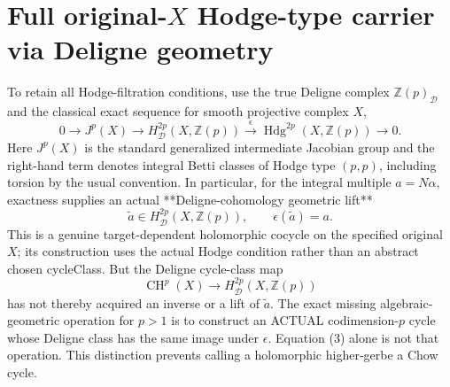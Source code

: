 \documentclass[11pt]{article}
\newcommand{\Z}{\mathbb Z}
\newcommand{\CH}{\operatorname{CH}}
\newcommand{\Hdg}{\operatorname{Hdg}}
\begin{document}
\section{Full original-\(X\) Hodge-type carrier via Deligne geometry}
To retain all Hodge-filtration conditions, use the
true Deligne complex \(\Z(p)_{\mathcal D}\) and the
classical exact sequence for smooth projective complex \(X\),
\[
 0\to J^p(X)
 \longrightarrow H^{2p}_{\mathcal D}(X,\Z(p))
 \xrightarrow{\epsilon}
 \Hdg^{2p}(X,\Z(p))
 \to0.                                              \tag{2}
\]
Here \(J^p(X)\) is the standard generalized intermediate
Jacobian group and the right-hand term denotes integral
Betti classes of Hodge type \((p,p)\), including torsion
by the usual convention. In particular, for the integral
multiple \(a=N\alpha\), exactness supplies an actual
**Deligne-cohomology geometric lift**
\[
 \boxed{\widetilde a\in
 H^{2p}_{\mathcal D}(X,\Z(p)),
 \qquad \epsilon(\widetilde a)=a.}                  \tag{3}
\]
This is a genuine target-dependent holomorphic cocycle on
the specified original \(X\); its construction uses the
actual Hodge condition rather than an abstract chosen
cycleClass. But the Deligne cycle-class map
\[
 \CH^p(X)\longrightarrow
 H^{2p}_{\mathcal D}(X,\Z(p))                       \tag{4}
\]
has not thereby acquired an inverse or a lift of \(\widetilde a\).
The exact missing algebraic-geometric operation for \(p>1\) is
to construct an ACTUAL codimension-\(p\) cycle whose
Deligne class has the same image under \(\epsilon\).
Equation (3) alone is not that operation. This distinction
prevents calling a holomorphic higher-gerbe a Chow cycle.
\end{document}
